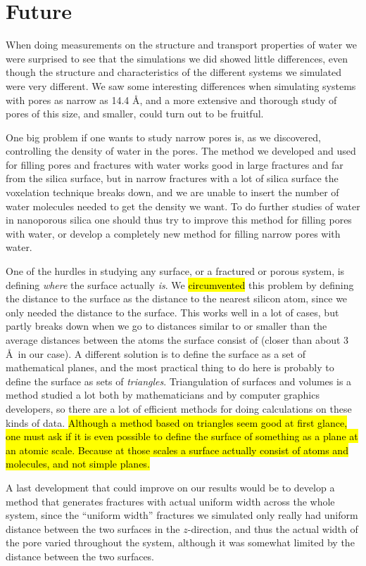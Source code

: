 \chapter{Future}
When doing measurements on the structure and transport properties of water we were surprised to see that the simulations we did showed little differences, even though the structure and characteristics of the different systems we simulated were very different. We saw some interesting differences when simulating systems with pores as narrow as 14.4 \AA, and a more extensive and thorough study of pores of this size, and smaller, could turn out to be fruitful. 

One big problem if one wants to study narrow pores is, as we discovered, controlling the density of water in the pores. The method we developed and used for filling pores and fractures with water works good in large fractures and far from the silica surface, but in narrow fractures with a lot of silica surface the voxelation technique breaks down, and we are unable to insert the number of water molecules needed to get the density we want. To do further studies of water in nanoporous silica one should thus try to improve this method for filling pores with water, or develop a completely new method for filling narrow pores with water.

One of the hurdles in studying any surface, or a fractured or porous system, is defining \emph{where} the surface actually \emph{is}. We \hl{circumvented} this problem by defining the distance to the surface as the distance to the nearest silicon atom, since we only needed the distance to the surface. This works well in a lot of cases, but partly breaks down when we go to distances similar to or smaller than the average distances between the atoms the surface consist of (closer than about 3 \AA\ in our case). A different solution is to define the surface as a set of mathematical planes, and the most practical thing to do here is probably to define the surface as sets of \emph{triangles}. Triangulation of surfaces and volumes is a method studied a lot both by mathematicians and by computer graphics developers, so there are a lot of efficient methods for doing calculations on these kinds of data. \hl{Although a method based on triangles seem good at first glance, one must ask if it is even possible to define the surface of something as a plane at an atomic scale. Because at those scales a surface actually consist of atoms and molecules, and not simple planes.}

A last development that could improve on our results would be to develop a method that generates fractures with actual uniform width across the whole system, since the ``uniform width'' fractures we simulated only really had uniform distance between the two surfaces in the $z$-direction, and thus the actual width of the pore varied throughout the system, although it was somewhat limited by the distance between the two surfaces.


